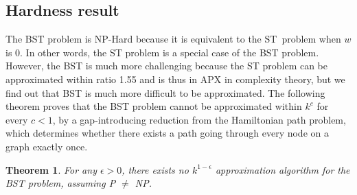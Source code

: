 \documentclass[conference]{IEEEtran}
\newtheorem{theorem}{Theorem}
\begin{document}
\subsection{Hardness result}

The BST problem is NP-Hard because it is equivalent to the ST\ problem when $w$ is 0. In other words, the ST problem is a special case of the BST
problem. However, the BST is much more challenging because the ST problem
can be approximated within ratio 1.55 \cite{Robins2000} and is thus in APX in
complexity theory, but we find out that BST is much more difficult to be
approximated. The following theorem proves that the BST problem cannot be
approximated within $k^{c}$ for every $c<1$, by a gap-introducing reduction
from the Hamiltonian path problem, which determines whether there exists a
path going through every node on a graph exactly once.



\begin{theorem}
\label{hardness} For any $\epsilon >0$, there exists no $k^{1-\epsilon }$
approximation algorithm for the BST problem, assuming P $\neq $ NP.
\end{theorem}
\end{document}
